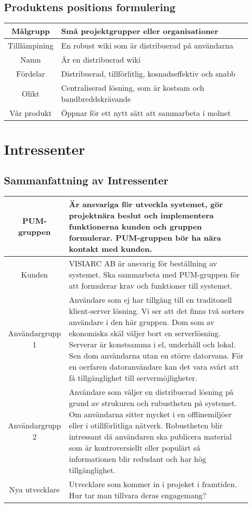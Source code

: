 \subsection{Produktens positions formulering} %
\begin{tabular}{|c|m{15 cm}|}
\hline
Målgrupp & Små projektgrupper eller organisationer\\
\hline
Tilllämpining & En robust wiki som är distribuerad på användarna \\
\hline
Namn & Är en distribuerad wiki  \\
\hline 
Fördelar & Distribuerad, tillförlitlig, kosnadseffektiv och snabb \\
\hline
Olikt & Centraliserad lösning, som är kostsam och bandbreddskrävande\\
\hline
Vår produkt & Öppnar för ett nytt sätt att sammarbeta i molnet \\
\hline
\end{tabular}
\section{Intressenter}
\subsection{Sammanfattning av Intressenter}
\begin{tabular}{|c|m{14 cm}|}
 \hline
PUM-gruppen & Är ansvariga för utveckla systemet, gör projektnära beslut och implementera funktionerna kunden och gruppen formulerar.  PUM-gruppen bör ha nära kontakt med kunden. \\ \hline
Kunden & VISIARC AB är ansvarig för beställning av systemet. Ska sammarbeta med PUM-gruppen för att formulerar krav och funktioner till systemet. \\ \hline
Användargrupp 1 & Användare som ej har tillgång till en traditonell klient-server lösning. Vi ser att det finns två sorters användare i den här gruppen. Dom som av ekonomiska skäl väljer bort en serverlösning. Serverar är konstsamma i el, underhåll och lokal. Sen dom användarna utan en större datorvana. För en oerfaren datoranvändare kan det vara svårt att få tillgänglighet till servermöjligheter. \\ \hline
Användargrupp 2 & Användare som väljer en distribuerad lösning på grund av strukuren och rubustheten på systemet. Om användarna sitter mycket i en offlinemiljöer eller i otillförlitliga nätverk. Robustheten blir intressant då användaren ska publicera material som är kontroversiellt eller populärt så informationen blir redudant och har hög tillgänglighet.\\ \hline
Nya utvecklare & Utvecklare som kommer in i projeket i framtiden. Hur tar man tillvara deras engagemang?\\ \hline
\end{tabular}
